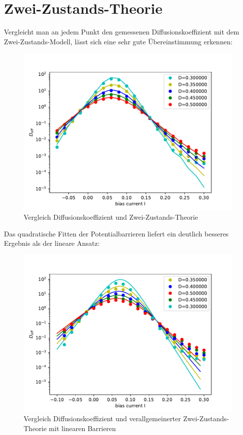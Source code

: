 \documentclass[12pt,a4paper]{article}
\begin{document}
\section{Zwei-Zustands-Theorie}
Vergleicht man an jedem Punkt den gemessenen Diffusionskoeffizient mit dem Zwei-Zustands-Modell, lässt sich eine sehr gute Übereinstimmung erkennen:
\begin{figure}[H]
	\centering
	\includegraphics[scale=0.9]{dcompdfpwnewrealfast11jjem2shrealfast19jjem2st.pdf}
	\caption{Vergleich Diffusionskoeffizient und Zwei-Zustands-Theorie}
	\label{dcomp}
\end{figure}
Das quadratische Fitten der Potentialbarrieren liefert ein deutlich besseres Ergebnis als der lineare Ansatz:
\begin{figure}[H]
	\centering
	\includegraphics[scale=0.9]{dcompdfnewrealfast11jjem2shrealfast19jjem2st.pdf}
	\caption{Vergleich Diffusionskoeffizient und verallgemeinerter Zwei-Zustands-Theorie mit linearen Barrieren}
	\label{dcomplin}
\end{figure}
\end{document}
